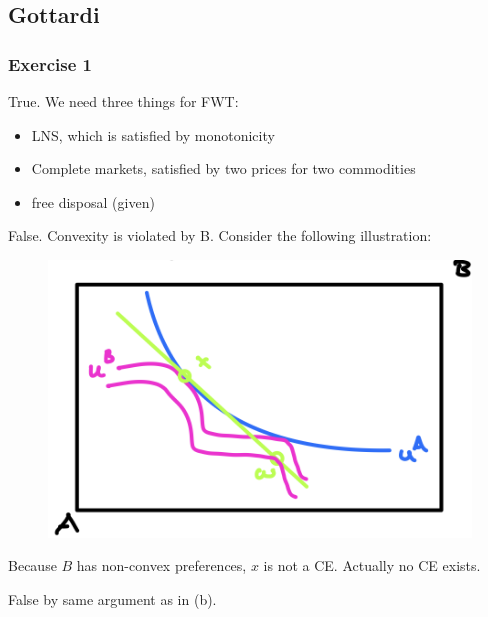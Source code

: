\newpage
{
\subsection*{Gottardi}

\subsubsection*{Exercise 1}

\begin{enumerate}[label=(\alph*)]
{\item 
True. We need three things for FWT:

\begin{itemize}
    \item LNS, which is satisfied by monotonicity
    \item Complete markets, satisfied by two prices for two commodities
    \item free disposal (given)
\end{itemize}
}
{\item 
False. Convexity is violated by B. Consider the following illustration:

\begin{figure}[!h]
    \centering
    \includegraphics[width=0.75\linewidth]{images/2014_15_1.png}    
\end{figure}

Because $B$ has non-convex preferences, $x$ is not a CE. Actually no CE exists.
}
{\item 
False by same argument as in (b).
}
\end{enumerate}
}
